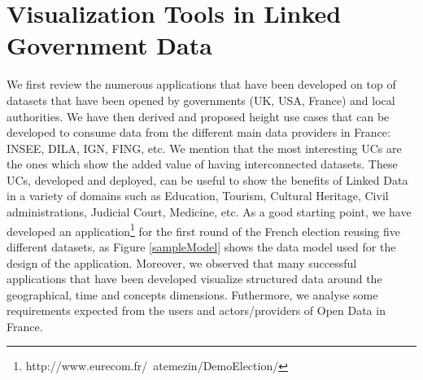 \documentclass[a4paper,11pt]{report}
\begin{document}
\chapter {Visualization Tools in Linked Government Data} \label{visu}
We first review the numerous applications that have been developed on top of datasets that have been opened by governments (UK, USA, France) and local authorities. We have then derived and proposed height use cases  that can be developed to consume data from the different main data providers in France: INSEE, DILA, IGN, FING, etc. We mention that the most interesting UCs are the ones which show the added value of having interconnected datasets. These UCs,  developed and deployed, can be useful to show the benefits of Linked Data in a variety of domains such as Education, Tourism, Cultural Heritage, Civil administrations, Judicial Court, Medicine, etc. As a good starting point, we have developed an application\footnote{http://www.eurecom.fr/~atemezin/DemoElection/} for the first round of the French election reusing five different datasets, as Figure \ref{sampleModel} shows the data model used for the design of the application. Moreover, we observed that many successful applications that have been developed visualize structured data around the geographical, time and concepts dimensions. Futhermore, we analyse some requirements expected from the users and actors/providers of Open Data in France. 
\end{document}
